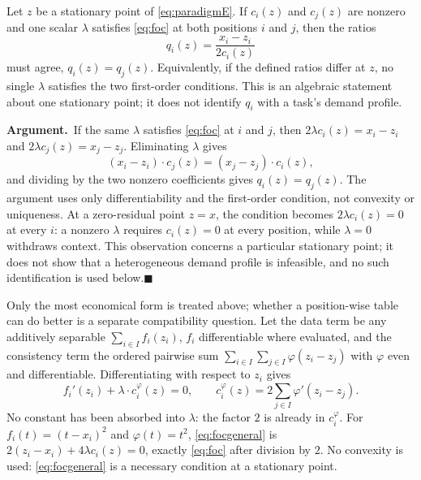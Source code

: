 \documentclass[twoside,11pt]{article}
\newcommand{\argument}{\par\medskip\noindent\textbf{Argument.}\ }
\newcommand{\qedbox}{\hfill$\blacksquare$}
\begin{document}
\begin{lemma}
Let $z$ be a stationary point of \eqref{eq:paradigmE}. If $c_i(z)$ and $c_j(z)$ are nonzero and one scalar $\lambda$ satisfies \eqref{eq:foc} at both positions $i$ and $j$, then the ratios
\begin{equation}
q_i(z) = \frac{x_i-z_i}{2c_i(z)}
\label{eq:qi}%
\end{equation}%
must agree, $q_i(z)=q_j(z)$. Equivalently, if the defined ratios differ at $z$, no single $\lambda$ satisfies the two first-order conditions. This is an algebraic statement about one stationary point; it does not identify $q_i$ with a task's demand profile.
\label{lem:scalar}%
\end{lemma}

\argument If the same $\lambda$ satisfies \eqref{eq:foc} at $i$ and $j$, then $2\lambda c_i(z)=x_i-z_i$ and $2\lambda c_j(z)=x_j-z_j$. Eliminating $\lambda$ gives
\begin{equation}
(x_i - z_i) \cdot c_j (z) = (x_j - z_j) \cdot c_i (z),
\label{eq:proportion}%
\end{equation}%
and dividing by the two nonzero coefficients gives $q_i(z)=q_j(z)$. The argument uses only differentiability and the first-order condition, not convexity or uniqueness. At a zero-residual point $z=x$, the condition becomes $2\lambda c_i(z)=0$ at every $i$: a nonzero $\lambda$ requires $c_i(z)=0$ at every position, while $\lambda=0$ withdraws context. This observation concerns a particular stationary point; it does not show that a heterogeneous demand profile is infeasible, and no such identification is used below.\qedbox

Only the most economical form is treated above; whether a position-wise table can do better is a separate compatibility question. Let the data term be any additively separable $\sum_{i \in I} f_i(z_i)$, $f_i$ differentiable where evaluated, and the consistency term the ordered pairwise sum $\sum_{i \in I} \sum_{j \in I} \varphi(z_i - z_j)$ with $\varphi$ even and differentiable. Differentiating with respect to $z_i$ gives
\begin{equation}
f_i'(z_i) + \lambda \cdot c_i^{\varphi}(z) = 0, \qquad c_i^{\varphi}(z) = 2 \sum_{j \in I} \varphi'(z_i - z_j).
\label{eq:focgeneral}%
\end{equation}%
No constant has been absorbed into $\lambda$: the factor $2$ is already in $c_i^{\varphi}$. For $f_i(t) = (t - x_i)^2$ and $\varphi(t) = t^2$, \eqref{eq:focgeneral} is $2(z_i-x_i)+4\lambda c_i(z)=0$, exactly \eqref{eq:foc} after division by $2$. No convexity is used: \eqref{eq:focgeneral} is a necessary condition at a stationary point.
\end{document}
